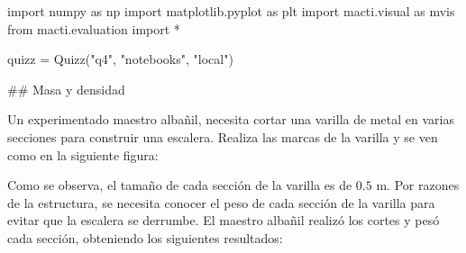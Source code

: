 \documentclass[
  letterpaper,
  DIV=11,
  numbers=noendperiod]{scrreprt}
\newenvironment{Shaded}{\begin{snugshade}}{\end{snugshade}}
\newcommand{\ImportTok}[1]{\textcolor[rgb]{0.00,0.46,0.62}{#1}}
\newcommand{\NormalTok}[1]{\textcolor[rgb]{0.00,0.23,0.31}{#1}}
\newcommand{\OperatorTok}[1]{\textcolor[rgb]{0.37,0.37,0.37}{#1}}
\newcommand{\StringTok}[1]{\textcolor[rgb]{0.13,0.47,0.30}{#1}}
\begin{document}
\begin{Shaded}
\begin{Highlighting}[]
\ImportTok{import}\NormalTok{ numpy }\ImportTok{as}\NormalTok{ np}
\ImportTok{import}\NormalTok{ matplotlib.pyplot }\ImportTok{as}\NormalTok{ plt}
\ImportTok{import}\NormalTok{ macti.visual }\ImportTok{as}\NormalTok{ mvis}
\ImportTok{from}\NormalTok{ macti.evaluation }\ImportTok{import} \OperatorTok{*}
\end{Highlighting}
\end{Shaded}

\begin{Shaded}
\begin{Highlighting}[]
\NormalTok{quizz }\OperatorTok{=}\NormalTok{ Quizz(}\StringTok{"q4"}\NormalTok{, }\StringTok{"notebooks"}\NormalTok{, }\StringTok{"local"}\NormalTok{)}
\end{Highlighting}
\end{Shaded}

\#\# Masa y densidad

Un experimentado maestro albañil, necesita cortar una varilla de metal
en varias secciones para construir una escalera. Realiza las marcas de
la varilla y se ven como en la siguiente figura:

Como se observa, el tamaño de cada sección de la varilla es de \(0.5\)
m. Por razones de la estructura, se necesita conocer el peso de cada
sección de la varilla para evitar que la escalera se derrumbe. El
maestro albañil realizó los cortes y pesó cada sección, obteniendo los
siguientes resultados:
\end{document}
